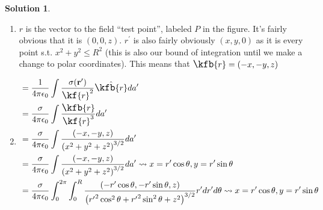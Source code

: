 \documentclass[10pt]{article}
\theoremstyle{definition}
\newtheorem{soln}{Solution}
\newcommand{\primed}[1]{#1^\prime}
\newcommand{\scriptr}{\fontsize{12pt}{12pt}\kf{r}}
\newcommand{\bscriptr}{\fontsize{12pt}{12pt}\kfb{r}}
\begin{document}
\begin{soln}
\begin{enumerate}[label=(\alph*)]
\begin{center}
          \end{center}
    \item $r$ is the vector to the field ``test point'', labeled $P$ in the figure. It's fairly obvious that it is $(0,0,z)$.
          $\primed{r}$ is also fairly obviously $(x,y,0)$ as it is every point s.t. $x^2+y^2\leq R^2$ (this is also our bound of integration until we make a change to polar coordinates).
          This means that $\bscriptr=(-x,-y,z)$
    \item \begin{align*}
             & = \frac{1}{4\pi\epsilon_0}\int\frac{\sigma(\mathbf{\primed{r}})}{\scriptr^2}\hat{\bscriptr}d\primed{a}                                                                                                                                                 \\
             & = \frac{\sigma}{4\pi\epsilon_0}\int\frac{\bscriptr}{\scriptr^3}d\primed{a}                                                                                                                                                                             \\
             & = \frac{\sigma}{4\pi\epsilon_0}\int\frac{(-x,-y,z)}{\left(x^2+y^2+z^2\right)^{3/2}}d\primed{a}                                                                                                                                                         \\
             & = \frac{\sigma}{4\pi\epsilon_0}\int\frac{(-x,-y,z)}{\left(x^2+y^2+z^2\right)^{3/2}}d\primed{a} \rightsquigarrow x=\primed{r}\cos\theta,y=\primed{r}\sin\theta                                                                                          \\
             & = \frac{\sigma}{4\pi\epsilon_0}\int_0^{2\pi}\int_0^R\frac{(-\primed{r}\cos\theta,-\primed{r}\sin\theta,z)}{\left({\primed{r}}^2\cos^2\theta+{\primed{r}}^2\sin^2\theta+z^2\right)^{3/2}}\primed{r}d\primed{r}d\theta
            \rightsquigarrow x=\primed{r}\cos\theta,y=\primed{r}\sin\theta                                                                                                                                                                                            \\

\end{align*}
\end{enumerate}
\end{soln}
\end{document}
